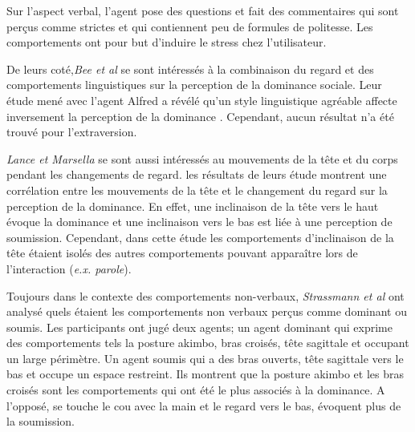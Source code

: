 		Sur l'aspect verbal, l'agent pose des questions et fait des commentaires qui sont perçus comme strictes et qui contiennent peu de formules de politesse. 
		 Les comportements ont pour but d'induire le stress chez l'utilisateur. 
		
		De leurs coté,\emph{Bee et al } \cite{bee2010bossy} se sont intéressés à la combinaison du regard et des comportements linguistiques sur la perception de la dominance sociale.  Leur étude mené avec l'agent Alfred a révélé qu'un style linguistique agréable affecte inversement la perception de la dominance \cite{bee2010bossy}. Cependant, aucun résultat n'a été trouvé pour l'extraversion.
		
		 \emph{Lance et Marsella} \cite{lance2008relation,lance2007emotionally} se sont aussi intéressés au mouvements de la tête et du corps pendant les changements de regard. les résultats de leurs étude montrent une corrélation entre les mouvements de la tête et le changement du regard sur la perception de la dominance. En effet, une inclinaison de la tête vers le haut évoque la dominance et une inclinaison vers le bas est liée à une perception de soumission. Cependant, dans cette étude les comportements d'inclinaison de la tête étaient isolés des autres comportements pouvant apparaître lors de l'interaction (\emph{e.x. parole}).
		
		Toujours dans le contexte des comportements non-verbaux, \emph{Strassmann et al} \cite{strassmann2016effect} ont analysé quels étaient les comportements non verbaux perçus comme dominant ou soumis. 
		Les participants ont jugé deux agents;  un agent dominant qui exprime des comportements tels la posture akimbo, bras croisés, tête sagittale et occupant un large périmètre. Un agent soumis qui a des bras ouverts, tête sagittale vers le bas et occupe un espace restreint.
		Ils montrent que la posture akimbo et les bras croisés sont les comportements qui ont été le plus associés à la dominance. A l'opposé, se touche le cou avec la main et le regard vers le bas, évoquent plus de la soumission. 
		
